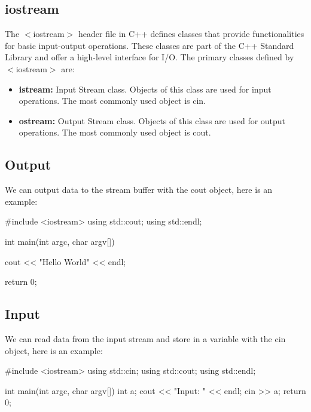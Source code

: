 \documentclass{report}
\begin{document}
    \subsection{iostream}
    \bigbreak \noindent 
    The $<$iostream$>$ header file in C++ defines classes that provide functionalities for basic input-output operations. These classes are part of the C++ Standard Library and offer a high-level interface for I/O. The primary classes defined by $<$iostream$>$ are:
    \begin{itemize}
        \item \textbf{istream:} Input Stream class. Objects of this class are used for input operations. The most commonly used object is cin.
        \item \textbf{ostream:} Output Stream class. Objects of this class are used for output operations. The most commonly used object is cout.
    \end{itemize}
    \bigbreak \noindent 
    \subsection{Output}
    \bigbreak \noindent 
    We can output data to the stream buffer with the cout object, here is an example:
    \bigbreak \noindent 
    
    \begin{cppcode}
#include <iostream>
using std::cout;
using std::endl;

int main(int argc, char argv[]){

    cout << "Hello World" << endl;

    return 0;
}
    \end{cppcode}
    
    \bigbreak \noindent 
    \subsection{Input}
    \bigbreak \noindent 
    We can read data from the input stream and store in a variable with the cin object, here is an example:
    \bigbreak \noindent 
    
    \begin{cppcode}
#include <iostream>
using std::cin;
using std::cout;
using std::endl;

int main(int argc, char argv[]){
    int a;
    cout << "Input: " << endl;
    cin >> a;
    return 0;
}

    \end{cppcode}
    
\end{document}
